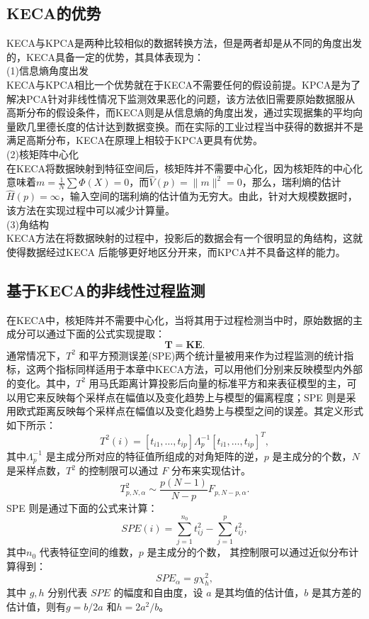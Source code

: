 \subsection{KECA的优势}
KECA与KPCA是两种比较相似的数据转换方法，但是两者却是从不同的角度出发的，KECA具备一定的优势，其具体表现为：\\
(1)信息熵角度出发\\
KECA与KPCA相比一个优势就在于KECA不需要任何的假设前提。KPCA是为了解决PCA针对非线性情况下监测效果恶化的问题，该方法依旧需要原始数据服从高斯分布的假设条件，而KECA则是从信息熵的角度出发，通过实现据集的平均向量欧几里德长度的估计达到数据变换。而在实际的工业过程当中获得的数据并不是满足高斯分布，KECA在原理上相较于KPCA更具有优势。\\
(2)核矩阵中心化\\
在KECA将数据映射到特征空间后，核矩阵并不需要中心化，因为核矩阵的中心化意味着$m=\frac{1}{N}\sum\Phi(X)=0$，而$\hat{V}(p)=\|m\|^2=0$，那么，瑞利熵的估计$\hat{H}(p)=\infty$，输入空间的瑞利熵的估计值为无穷大。由此，针对大规模数据时，该方法在实现过程中可以减少计算量。\\
(3)角结构\\
KECA方法在将数据映射的过程中，投影后的数据会有一个很明显的角结构，这就使得数据经过KECA 后能够更好地区分开来，而KPCA并不具备这样的能力。
\subsection{基于KECA的非线性过程监测}

在KECA中，核矩阵并不需要中心化，当将其用于过程检测当中时，原始数据的主成分可以通过下面的公式实现提取：
\begin{equation}
\textbf{T}=\textbf{KE}.
\end{equation}
通常情况下，$T^2$ 和平方预测误差(SPE)两个统计量被用来作为过程监测的统计指标，这两个指标同样适用于本章中KECA方法，可以用他们分别来反映模型内外部的变化。其中，$T^2$ 用马氏距离计算投影后向量的标准平方和来表征模型的主，可以用它来反映每个采样点在幅值以及变化趋势上与模型的偏离程度；SPE 则是采用欧式距离反映每个采样点在幅值以及变化趋势上与模型之间的误差。其定义形式如下所示：
\begin{equation}
T^2(i)=[t_{i1},\ldots,t_{ip}] \Lambda_{p}^{-1} [t_{i1},\ldots,t_{ip}]^T,
\end{equation}%
其中$\Lambda_{p}^{-1}$ 是主成分所对应的特征值所组成的对角矩阵的逆，$p$ 是主成分的个数，$N$是采样点数，$T^2$ 的控制限可以通过 $F$ 分布来实现估计。
\begin{equation}\label{6}
T^2_{p,N,\alpha}\sim\frac{p(N-1)}{N-p}F_{p,N-p,\alpha}.
\end{equation}
SPE 则是通过下面的公式来计算：
\begin{equation}\label{T^2}
SPE(i)=\sum\limits_{j=1}^{n_0}t_{ij}^2-\sum_{j=1}^{p}t_{ij}^2,
\end{equation}
其中$n_0$ 代表特征空间的维数，$p$ 是主成分的个数，
其控制限可以通过近似分布计算得到：
\begin{equation}\label{SPE}
SPE_\alpha=g\chi_h^2,
\end{equation}
其中 $g , h$ 分别代表 $SPE$ 的幅度和自由度，设 $a$ 是其均值的估计值，$b$ 是其方差的估计值，则有$g=b/2a$ 和$h=2a^2/b$。

